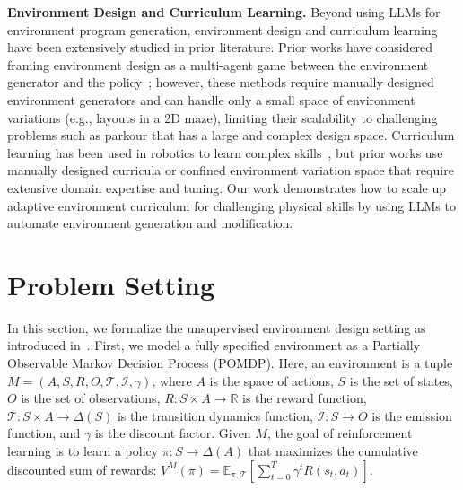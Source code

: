 \documentclass{article}
\begin{document}
\textbf{Environment Design and Curriculum Learning.} Beyond using LLMs for environment program generation, environment design and curriculum learning have been extensively studied in prior literature. Prior works have considered framing environment design as a multi-agent game between the environment generator and the policy~\citep{wang2019paired,wang2020enhanced,dennis2020emergent,jiang2021prioritized,jiang2021replay,parker2022evolving,bhatt2022deep,mediratta2023stabilizing}; however, these methods require manually designed environment generators and can handle only a small space of environment variations (e.g., layouts in a 2D maze), limiting their scalability to challenging problems such as parkour that has a large and complex design space. Curriculum learning has been used in robotics to learn complex skills~\citep{florensa2017reverse,florensa2018automatic,margolis2022rapid,akkaya2019solving,tang2021learning,kaufmann2023champion}, but prior works use manually designed curricula or confined environment variation space that require extensive domain expertise and tuning. Our work demonstrates how to scale up adaptive environment curriculum for challenging physical skills by using LLMs to automate environment generation and modification. 


\section{Problem Setting}
\label{sec:problem-setting}
In this section, we formalize the unsupervised environment design setting as introduced in~\citep{dennis2020emergent}. First, we model a fully specified environment as a Partially Observable Markov Decision Process (POMDP). Here, an environment is a tuple $ M = (A, S, R, O,\mathcal{T},\mathcal{I}, \gamma)$, where $A$ is the space of actions, $S$ is the set of states, $O$ is the set of observations, $R: S\times A \rightarrow \mathbb{R}$ is the reward function, $\mathcal{T}: S \times A \rightarrow \Delta(S)$ is the transition dynamics function, $\mathcal{I}: S \rightarrow O$ is the emission function, and $\gamma$ is the discount factor. Given $M$, the goal of reinforcement learning is to learn a policy $\pi:S\rightarrow \Delta(A)$ that maximizes the cumulative discounted sum of rewards: $V^M(\pi) = \mathbb{E}_{\pi, \mathcal{T}}[\sum_{t=0}^T \gamma^t R(s_t,a_t)]$.
\end{document}
